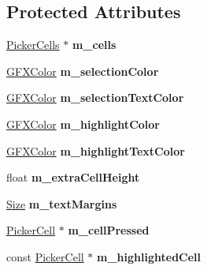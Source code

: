 \subsection*{Protected Attributes}
\begin{DoxyCompactItemize}
\item 
\hyperlink{classPickerCells}{Picker\+Cells} $\ast$ {\bfseries m\+\_\+cells}\hypertarget{classPicker_aac47fe393c70f2a0487e51f808b528bf}{}\label{classPicker_aac47fe393c70f2a0487e51f808b528bf}

\item 
\hyperlink{structGFXColor}{G\+F\+X\+Color} {\bfseries m\+\_\+selection\+Color}\hypertarget{classPicker_a6e52512a619403794fccc1b0c65b3476}{}\label{classPicker_a6e52512a619403794fccc1b0c65b3476}

\item 
\hyperlink{structGFXColor}{G\+F\+X\+Color} {\bfseries m\+\_\+selection\+Text\+Color}\hypertarget{classPicker_a55e19e70dd3fca4ba9314e8a54351255}{}\label{classPicker_a55e19e70dd3fca4ba9314e8a54351255}

\item 
\hyperlink{structGFXColor}{G\+F\+X\+Color} {\bfseries m\+\_\+highlight\+Color}\hypertarget{classPicker_aa49d7d969c5446d4bcb06a1b5d1dae92}{}\label{classPicker_aa49d7d969c5446d4bcb06a1b5d1dae92}

\item 
\hyperlink{structGFXColor}{G\+F\+X\+Color} {\bfseries m\+\_\+highlight\+Text\+Color}\hypertarget{classPicker_af0b08532b1108ddff76a579b12bbf350}{}\label{classPicker_af0b08532b1108ddff76a579b12bbf350}

\item 
float {\bfseries m\+\_\+extra\+Cell\+Height}\hypertarget{classPicker_ae60d98961a1412b437d1357d2c39a61d}{}\label{classPicker_ae60d98961a1412b437d1357d2c39a61d}

\item 
\hyperlink{structSize}{Size} {\bfseries m\+\_\+text\+Margins}\hypertarget{classPicker_ab546edfcb868b53b51eb040069b7d79f}{}\label{classPicker_ab546edfcb868b53b51eb040069b7d79f}

\item 
\hyperlink{classPickerCell}{Picker\+Cell} $\ast$ {\bfseries m\+\_\+cell\+Pressed}\hypertarget{classPicker_a17a97806241259ca79fd29717048ce97}{}\label{classPicker_a17a97806241259ca79fd29717048ce97}

\item 
const \hyperlink{classPickerCell}{Picker\+Cell} $\ast$ {\bfseries m\+\_\+highlighted\+Cell}\hypertarget{classPicker_a4fac960e8948ddc7d8241ea3480c6209}{}\label{classPicker_a4fac960e8948ddc7d8241ea3480c6209}


\end{DoxyCompactItemize}

